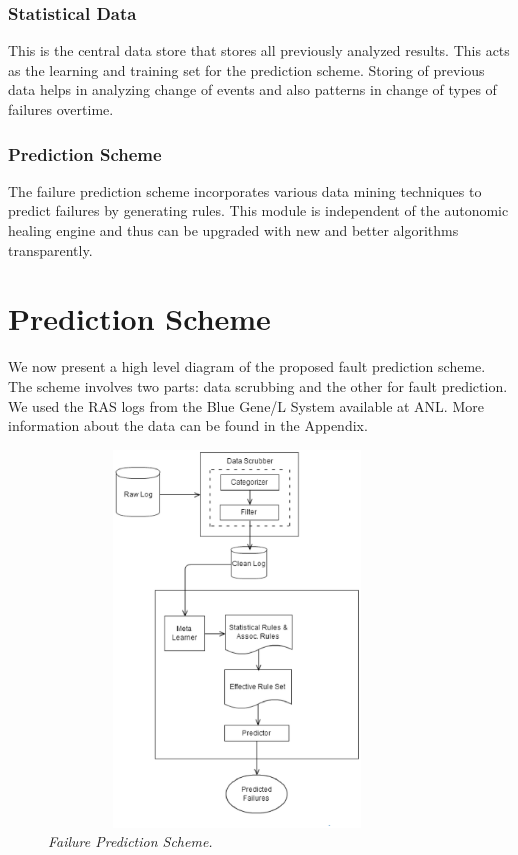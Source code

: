 \subsubsection{Statistical Data}
This is the central data store that stores all previously analyzed results. This acts as the learning and training set for the prediction scheme. Storing of previous data helps in analyzing change of events and also patterns in change of types of failures overtime.
\subsubsection{Prediction Scheme}
The failure prediction scheme incorporates various data mining techniques to predict failures by generating rules. This module is independent of the autonomic healing engine and thus can be upgraded with new and better algorithms transparently.
\section{Prediction Scheme}
We now present a high level diagram of the proposed fault prediction scheme. The scheme involves two parts: data scrubbing and the other for fault prediction. We used the RAS logs from the Blue Gene/L System available at ANL.\cite{FAILURE_1}\cite{BLUEGENE_1}\cite{BLUEGENE_2}\cite{FAILURE_4} More information about the data can be found in the Appendix.
\begin{figure}[t]
		\begin{center}
			\includegraphics[width=10cm,height=10cm]{figures/failure_prediction_scheme.eps} 
			\caption{\small \sl Failure Prediction Scheme.\label{fig:Label7}} 
		\end{center} 
	\end{figure}


